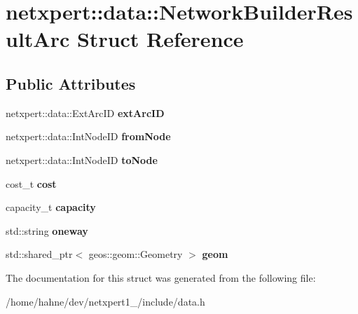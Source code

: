 \hypertarget{structnetxpert_1_1data_1_1NetworkBuilderResultArc}{}\section{netxpert\+:\+:data\+:\+:Network\+Builder\+Result\+Arc Struct Reference}
\label{structnetxpert_1_1data_1_1NetworkBuilderResultArc}
\subsection*{Public Attributes}
\begin{DoxyCompactItemize}
\item 
netxpert\+::data\+::\+Ext\+Arc\+ID {\bfseries ext\+Arc\+ID}\hypertarget{structnetxpert_1_1data_1_1NetworkBuilderResultArc_a89b02b1e1193c1e76a0245af7a457672}{}\label{structnetxpert_1_1data_1_1NetworkBuilderResultArc_a89b02b1e1193c1e76a0245af7a457672}

\item 
netxpert\+::data\+::\+Int\+Node\+ID {\bfseries from\+Node}\hypertarget{structnetxpert_1_1data_1_1NetworkBuilderResultArc_ad36e37d10416c0407838a1937098e4e4}{}\label{structnetxpert_1_1data_1_1NetworkBuilderResultArc_ad36e37d10416c0407838a1937098e4e4}

\item 
netxpert\+::data\+::\+Int\+Node\+ID {\bfseries to\+Node}\hypertarget{structnetxpert_1_1data_1_1NetworkBuilderResultArc_a4699143444b09a28107dea1f4b839e4d}{}\label{structnetxpert_1_1data_1_1NetworkBuilderResultArc_a4699143444b09a28107dea1f4b839e4d}

\item 
cost\+\_\+t {\bfseries cost}\hypertarget{structnetxpert_1_1data_1_1NetworkBuilderResultArc_a38d019c49042828fd1830bffb1b1094e}{}\label{structnetxpert_1_1data_1_1NetworkBuilderResultArc_a38d019c49042828fd1830bffb1b1094e}

\item 
capacity\+\_\+t {\bfseries capacity}\hypertarget{structnetxpert_1_1data_1_1NetworkBuilderResultArc_a8038e19a6bb50e7f37ceb2ff2651a818}{}\label{structnetxpert_1_1data_1_1NetworkBuilderResultArc_a8038e19a6bb50e7f37ceb2ff2651a818}

\item 
std\+::string {\bfseries oneway}\hypertarget{structnetxpert_1_1data_1_1NetworkBuilderResultArc_a41f4d23ac63c68345a75b5b1c07c756d}{}\label{structnetxpert_1_1data_1_1NetworkBuilderResultArc_a41f4d23ac63c68345a75b5b1c07c756d}

\item 
std\+::shared\+\_\+ptr$<$ geos\+::geom\+::\+Geometry $>$ {\bfseries geom}\hypertarget{structnetxpert_1_1data_1_1NetworkBuilderResultArc_a55fcc155aa1ff55426aa5a6c46b50198}{}\label{structnetxpert_1_1data_1_1NetworkBuilderResultArc_a55fcc155aa1ff55426aa5a6c46b50198}

\end{DoxyCompactItemize}


The documentation for this struct was generated from the following file\+:\begin{DoxyCompactItemize}
\item 
/home/hahne/dev/netxpert1\+\_/include/data.\+h\end{DoxyCompactItemize}
